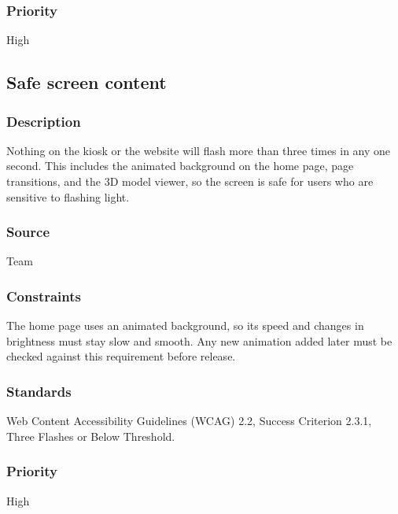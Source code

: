\subsubsection{Priority}
High

\subsection{Safe screen content}
\subsubsection{Description}
Nothing on the kiosk or the website will flash more than three times in any one second. This includes the animated background on the home page, page transitions, and the 3D model viewer, so the screen is safe for users who are sensitive to flashing light.
\subsubsection{Source}
Team
\subsubsection{Constraints}
The home page uses an animated background, so its speed and changes in brightness must stay slow and smooth. Any new animation added later must be checked against this requirement before release.
\subsubsection{Standards}
Web Content Accessibility Guidelines (WCAG) 2.2, Success Criterion 2.3.1, Three Flashes or Below Threshold.
\subsubsection{Priority}
High
